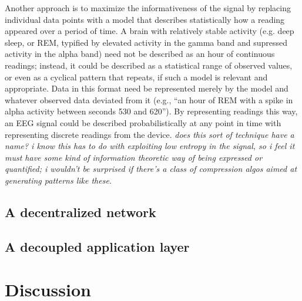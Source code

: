 \documentclass[a4paper,twoside]{article}
\begin{document}
Another approach is to maximize the informativeness of the signal by replacing individual data points with a model that describes statistically how a reading appeared over a period of time. A brain with relatively stable activity (e.g. deep sleep, or REM, typified by elevated activity in the gamma band and supressed activity in the alpha band) need not be described as an hour of continuous readings; instead, it could be described as a statistical range of observed values, or even as a cyclical pattern that repeats, if such a model is relevant and appropriate. Data in this format need be represented merely by the model and whatever observed data deviated from it (e.g., ``an hour of REM with a spike in alpha activity between seconds 530 and 620''). By representing readings this way, an EEG signal could be described probabilistically at any point in time with representing discrete readings from the device. \textit{does this sort of technique have a name? i know this has to do with exploiting low entropy in the signal, so i feel it must have some kind of information theoretic way of being expressed or quantified; i wouldn't be surprised if there's a class of compression algos aimed at generating patterns like these.}

\subsection{A decentralized network}

\subsection{A decoupled application layer}





\section{Discussion}




% 
% 

\vfill

{\small
}

\vfill
\end{document}
